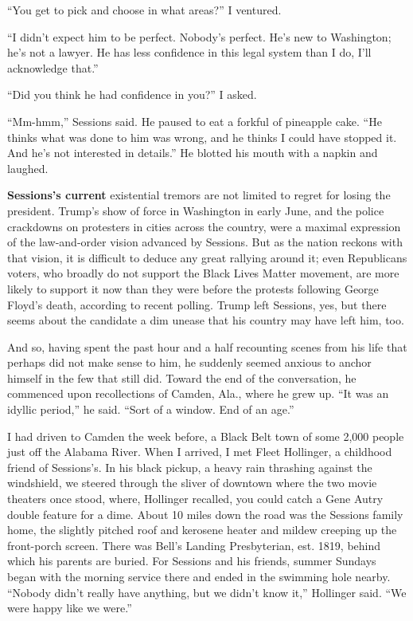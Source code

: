 ``You get to pick and choose in what areas?'' I ventured.

``I didn't expect him to be perfect. Nobody's perfect. He's new to
Washington; he's not a lawyer. He has less confidence in this legal
system than I do, I'll acknowledge that.''

``Did you think he had confidence in you?'' I asked.

``Mm-hmm,'' Sessions said. He paused to eat a forkful of pineapple cake.
``He thinks what was done to him was wrong, and he thinks I could have
stopped it. And he's not interested in details.'' He blotted his mouth
with a napkin and laughed.

\textbf{Sessions's current} existential tremors are not limited to
regret for losing the president. Trump's show of force in Washington in
early June, and the police crackdowns on protesters in cities across the
country, were a maximal expression of the law-and-order vision advanced
by Sessions. But as the nation reckons with that vision, it is difficult
to deduce any great rallying around it; even Republicans voters, who
broadly do not support the Black Lives Matter movement, are more likely
to support it now than they were before the protests following George
Floyd's death, according to recent polling. Trump left Sessions, yes,
but there seems about the candidate a dim unease that his country may
have left him, too.

And so, having spent the past hour and a half recounting scenes from his
life that perhaps did not make sense to him, he suddenly seemed anxious
to anchor himself in the few that still did. Toward the end of the
conversation, he commenced upon recollections of Camden, Ala., where he
grew up. ``It was an idyllic period,'' he said. ``Sort of a window. End
of an age.''

I had driven to Camden the week before, a Black Belt town of some 2,000
people just off the Alabama River. When I arrived, I met Fleet
Hollinger, a childhood friend of Sessions's. In his black pickup, a
heavy rain thrashing against the windshield, we steered through the
sliver of downtown where the two movie theaters once stood, where,
Hollinger recalled, you could catch a Gene Autry double feature for a
dime. About 10 miles down the road was the Sessions family home, the
slightly pitched roof and kerosene heater and mildew creeping up the
front-porch screen. There was Bell's Landing Presbyterian, est. 1819,
behind which his parents are buried. For Sessions and his friends,
summer Sundays began with the morning service there and ended in the
swimming hole nearby. ``Nobody didn't really have anything, but we
didn't know it,'' Hollinger said. ``We were happy like we were.''

